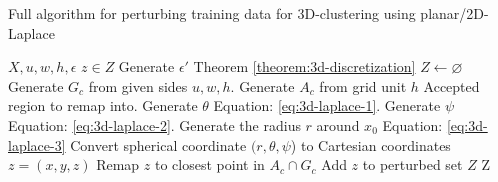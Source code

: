 \begin{algorithm}[H]
  \caption{Full algorithm for perturbing training data for 3D-clustering using planar/2D-Laplace \citep{DBLP:journals/corr/abs-1212-1984}}\label{alg:rq1}
  \begin{algorithmic}
    \Require $X, u, w, h, \epsilon$
    \Ensure $z \in Z$ 
    \State Generate $\epsilon'$ \Comment Theorem \ref{theorem:3d-discretization}
    \State $Z \gets \varnothing$ 
    \State Generate $G_c$ from given sides $u, w, h$.
    \State Generate $A_c$ from grid unit $h$ \Comment Accepted region to remap into.
    \State Generate $\theta$      \Comment  Equation: \ref{eq:3d-laplace-1}.
    \State Generate  $\psi$     \Comment Equation: \ref{eq:3d-laplace-2}.
    \State Generate the radius $r$ around $x_0$          \Comment Equation: \ref{eq:3d-laplace-3}
    \State Convert spherical coordinate $(r, \theta, \psi$) to Cartesian coordinates $z = (x, y, z)$ 
        \State Remap $z$ to closest point in $A_c \cap G_c$ 
    \EndIf
    \State Add $z$ to perturbed set $Z$  
    \EndFor
    \State \Return Z
  \end{algorithmic}
  \label{alg:3d-laplace}
\end{algorithm}